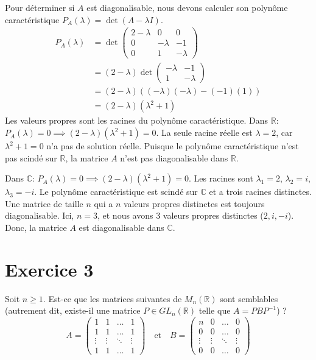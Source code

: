 \begin{solution}
Pour déterminer si $A$ est diagonalisable, nous devons calculer son polynôme caractéristique $P_A(\lambda) = \det(A - \lambda I)$.
\begin{align*} P_A(\lambda) &= \det \begin{pmatrix} 2-\lambda & 0 & 0 \\ 0 & -\lambda & -1 \\ 0 & 1 & -\lambda \end{pmatrix} \\ &= (2-\lambda) \det \begin{pmatrix} -\lambda & -1 \\ 1 & -\lambda \end{pmatrix} \\ &= (2-\lambda) ((-\lambda)(-\lambda) - (-1)(1)) \\ &= (2-\lambda) (\lambda^2 + 1) \end{align*}
Les valeurs propres sont les racines du polynôme caractéristique.
Dans $\mathbb{R}$: $P_A(\lambda) = 0 \implies (2-\lambda)(\lambda^2+1) = 0$. La seule racine réelle est $\lambda = 2$, car $\lambda^2+1 = 0$ n'a pas de solution réelle. Puisque le polynôme caractéristique n'est pas scindé sur $\mathbb{R}$, la matrice $A$ n'est pas diagonalisable dans $\mathbb{R}$.

Dans $\mathbb{C}$: $P_A(\lambda) = 0 \implies (2-\lambda)(\lambda^2+1) = 0$. Les racines sont $\lambda_1 = 2$, $\lambda_2 = i$, $\lambda_3 = -i$.
Le polynôme caractéristique est scindé sur $\mathbb{C}$ et a trois racines distinctes. Une matrice de taille $n$ qui a $n$ valeurs propres distinctes est toujours diagonalisable. Ici, $n=3$, et nous avons 3 valeurs propres distinctes ($2, i, -i$).
Donc, la matrice $A$ est diagonalisable dans $\mathbb{C}$.
\end{solution}

\section{Exercice 3}
Soit $n \geq 1$. Est-ce que les matrices suivantes de $M_n(\mathbb{R})$ sont semblables (autrement dit, existe-il une matrice $P \in GL_n(\mathbb{R})$ telle que $A = PBP^{-1}$) ?
\[ A = \begin{pmatrix} 1 & 1 & \dots & 1 \\ 1 & 1 & \dots & 1 \\ \vdots & \vdots & \ddots & \vdots \\ 1 & 1 & \dots & 1 \end{pmatrix} \quad \text{et} \quad B = \begin{pmatrix} n & 0 & \dots & 0 \\ 0 & 0 & \dots & 0 \\ \vdots & \vdots & \ddots & \vdots \\ 0 & 0 & \dots & 0 \end{pmatrix} \]

